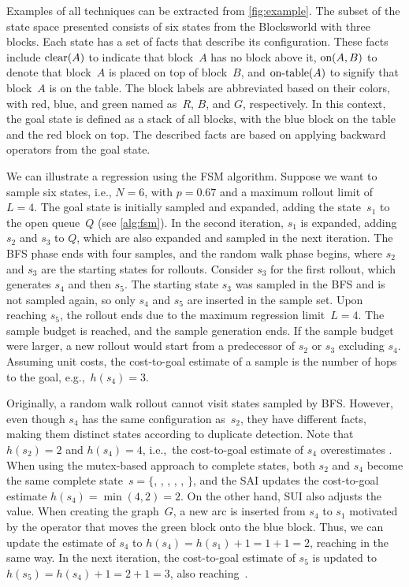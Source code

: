 Examples of all techniques can be extracted from \cref{fig:example}. The subset of the state space presented consists of six states from the Blocksworld with three blocks. Each state has a set of facts that describe its configuration. These facts include $\text{clear}(A)$ to indicate that block~$A$ has no block above it, $\text{on}(A,B)$ to denote that block~$A$ is placed on top of block~$B$, and $\text{on-table}(A)$ to signify that block~$A$ is on the table. The block labels are abbreviated based on their colors, with red, blue, and green named as~$R$, $B$, and $G$, respectively. In this context, the goal state is defined as a stack of all blocks, with the blue block on the table and the red block on top. The described facts are based on applying backward operators from the goal state.

We can illustrate a regression using the FSM algorithm. Suppose we want to sample six states, i.e., $N=6$, with $p=0.67$ and a maximum rollout limit of $L=4$. The goal state is initially sampled and expanded, adding the state~$s_1$ to the open queue~$Q$ (see \cref{alg:fsm}). In the second iteration, $s_1$ is expanded, adding $s_2$ and $s_3$ to $Q$, which are also expanded and sampled in the next iteration. The BFS phase ends with four samples, and the random walk phase begins, where $s_2$ and $s_3$ are the starting states for rollouts. Consider $s_3$ for the first rollout, which generates $s_4$ and then $s_5$. The starting state $s_3$ was sampled in the BFS and is not sampled again, so only $s_4$ and $s_5$ are inserted in the sample set. Upon reaching $s_5$, the rollout ends due to the maximum regression limit~$L = 4$. The sample budget is reached, and the sample generation ends. If the sample budget were larger, a new rollout would start from a predecessor of $s_2$ or $s_3$ excluding $s_4$. Assuming unit costs, the cost-to-goal estimate of a sample is the number of hops to the goal, e.g.,~$h(s_4)=3$.

Originally, a random walk rollout cannot visit states sampled by BFS. However, even though $s_4$ has the same configuration as~$s_2$, they have different facts, making them distinct states according to duplicate detection. Note that $h(s_2)=2$ and $h(s_4)=4$, i.e.,~the cost-to-goal estimate of $s_4$ overestimates \hstar. When using the mutex-based approach to complete states, both $s_2$ and $s_4$ become the same complete state~$s = \{$\mbox{}, \mbox{}, \mbox{}, \mbox{}, \mbox{}, \mbox{}$\}$, and the SAI updates the cost-to-goal estimate $h(s_4)=\min(4,2)=2$. On the other hand, SUI also adjusts the value. When creating the graph~$G$, a new arc is inserted from $s_4$ to $s_1$ motivated by the operator that moves the green block onto the blue block. Thus, we can update the estimate of $s_4$ to $h(s_4)=h(s_1)+1=1+1=2$, reaching \hstar in the same way. In the next iteration, the cost-to-goal estimate of $s_5$ is updated to $h(s_5)=h(s_4)+1=2+1=3$, also reaching~\hstar.

